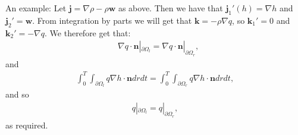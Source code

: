 \documentclass[11pt, a4paper]{article}
\theoremstyle{definition}
\newcommand{\w}{\mathbf{w}}
\newcommand{\n}{\mathbf{n}}
\newcommand{\jf}{\mathbf j}
\begin{document}
	\\
	\\
	An example: Let $\jf = \nabla \rho - \rho \w$ as above. Then we have that $\jf_1'(h) = \nabla h$ and $\jf_2' = \w $. From integration by parts we will get that $\mathbf k = - \rho \nabla q$, so $\mathbf k_1' = 0$ and $\mathbf k_2' = -  \nabla q$.
	We therefore get that:
	\begin{align*}
		& \nabla q \cdot \n |_{\partial \Omega_l} = \nabla q \cdot \n |_{\partial \Omega_r},
	\end{align*}
	and
	\begin{align*}
		\int_0^T \int_{\partial \Omega_l}  q \nabla h   \cdot \n    dr dt = \int_0^T \int_{\partial \Omega_r} q \nabla h  \cdot \n    dr dt,
	\end{align*}
	and so 
	\begin{align*}
		q |_{\partial \Omega_l} = q|_{\partial \Omega_r},
	\end{align*}
	as required.
\end{document}
